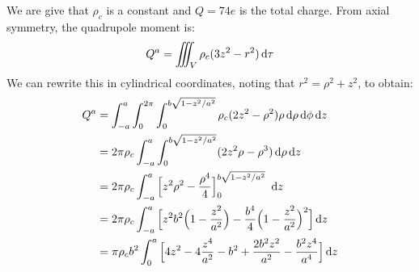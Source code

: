                 \begin{solution}
                    We are give that $\rho_{c}$ is a constant and
                    $Q=74e$ is the total charge. From axial symmetry, the
                    quadrupole moment is:
                    \begin{equation}
                        Q^{a}=\iiint_{V}\rho_{c}(3z^{2}-r^{2})\mathop{}\!\mathrm{d}{\tau}
                    \end{equation}
                    We can rewrite this in cylindrical coordinates,
                    noting that $r^{2}=\rho^{2}+z^{2}$, to obtain:
                    \begin{subequations}
                        \begin{align}
                            Q^{a}&=\int_{-a}^{a}\int_{0}^{2\pi}
                                \int_{0}^{b\sqrt{1-z^{2}/a^{2}}}
                                    \rho_{c}(2z^{2}-\rho^{2})\rho
                                    \diff{\rho}\diff{\phi}\diff{z}\\
                                &=2\pi\rho_{c}\int_{-a}^{a}
                                    \int_{0}^{b\sqrt{1-z^{2}/a^{2}}}
                                    (2z^{2}\rho-\rho^{3})
                                    \diff{\rho}\diff{z}\\
                                &=2\pi\rho_{c}\int_{-a}^{a}
                                    \Big[z^{2}\rho^{2}-
                                         \frac{\rho^{4}}{4}
                                    \Big]_{0}^{b\sqrt{1-z^{2}/a^{2}}}\
                                    \diff{z}\\
                                &=2\pi\rho_{c}\int_{-a}^{a}
                                    \Big[z^{2}b^{2}
                                        \Big(1-\frac{z^{2}}{a^{2}}\Big)
                                        -\frac{b^{4}}{4}
                                        \Big(
                                            1-\frac{z^{2}}{a^{2}}
                                        \Big)^{2}
                                    \Big]\diff{z}\\
                                &=\pi\rho_{c}b^{2}\int_{0}^{a}
                                    \Big[4z^{2}-
                                         4\frac{z^{4}}{a^{2}}-
                                         b^{2}+
                                         \frac{2b^{2}z^{2}}{a^{2}}-
                                         \frac{b^{2}z^{4}}{a^{4}}
                                    \Big]\diff{z}\\

\end{align}
\end{subequations}
\end{solution}
